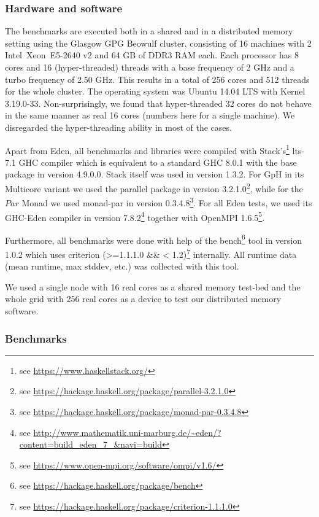 \documentclass{jfp1}
\newcommand{\Conid}[1]{\mathit{#1}}
\begin{document}
\subsubsection{Hardware and software}

The benchmarks are executed  both in a shared and in a distributed memory setting using the Glasgow GPG Beowulf cluster, consisting of
16 machines with 2 Intel\SymbReg~Xeon\SymbReg~E5-2640 v2 and 64 GB of DDR3 RAM each. Each processor has 8 cores and 16 (hyper-threaded) threads with a base frequency of 2 GHz and a turbo frequency of 2.50 GHz. This results in a total of 256 cores and 512 threads for the whole cluster. The operating system was Ubuntu 14.04 LTS with Kernel 3.19.0-33. Non-surprisingly, we found that hyper-threaded 32 cores do not behave in the same manner as real 16 cores (numbers here for a single machine). We disregarded the hyper-threading ability in most of the cases.

Apart from Eden, all benchmarks and libraries were compiled with Stack's\footnote{see \url{https://www.haskellstack.org/}} lts-7.1 GHC compiler which is equivalent to a standard GHC 8.0.1 with the base package in version 4.9.0.0. Stack itself was used in version 1.3.2. For GpH in its Multicore variant we used the parallel package in version 3.2.1.0\footnote{see \url{https://hackage.haskell.org/package/parallel-3.2.1.0}}, while for the \ensuremath{\Conid{Par}} Monad we used monad-par in version 0.3.4.8\footnote{see \url{https://hackage.haskell.org/package/monad-par-0.3.4.8}}. For all Eden tests, we used its GHC-Eden compiler in version 7.8.2\footnote{see \url{http://www.mathematik.uni-marburg.de/~eden/?content=build_eden_7_&navi=build}} together with OpenMPI 1.6.5\footnote{see \url{https://www.open-mpi.org/software/ompi/v1.6/}}.

Furthermore, all benchmarks were done with help of the bench\footnote{see \url{https://hackage.haskell.org/package/bench}} tool in version 1.0.2 which uses criterion (>=1.1.1.0 \&\& < 1.2)\footnote{see \url{https://hackage.haskell.org/package/criterion-1.1.1.0}} internally. All runtime data (mean runtime, max stddev, etc.) was collected with this tool.

We used a single node with 16 real cores as a shared memory test-bed
and the whole grid with 256 real cores as a device to test our
distributed memory software.

\subsubsection{Benchmarks}
\end{document}
